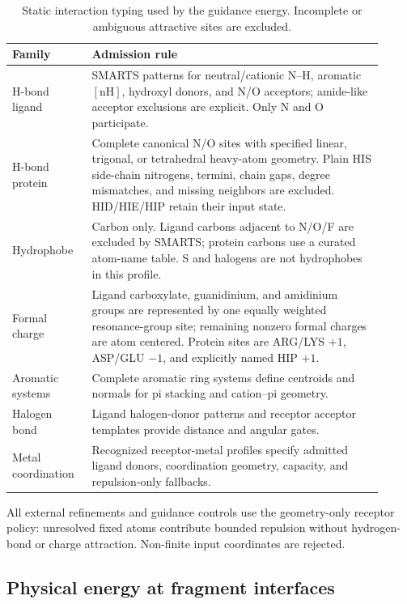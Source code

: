\documentclass{article}
\begin{document}
\begin{table}[!t]
    \centering
    \caption{Static interaction typing used by the guidance energy. Incomplete or ambiguous attractive sites are excluded.}
    \label{tab:si_typing}
    \begin{tabular}{p{0.19\linewidth}p{0.72\linewidth}}
        \toprule
        Family & Admission rule \\
        \midrule
        H-bond ligand & SMARTS patterns for neutral/cationic N--H, aromatic \(\mathrm{[nH]}\), hydroxyl donors, and N/O acceptors; amide-like acceptor exclusions are explicit.
        Only N and O participate. \\
        H-bond protein & Complete canonical N/O sites with specified linear, trigonal, or tetrahedral heavy-atom geometry.
        Plain HIS side-chain nitrogens, termini, chain gaps, degree mismatches, and missing neighbors are excluded.
        HID/HIE/HIP retain their input state. \\
        Hydrophobe & Carbon only.
        Ligand carbons adjacent to N/O/F are excluded by SMARTS; protein carbons use a curated atom-name table.
        S and halogens are not hydrophobes in this profile. \\
        Formal charge & Ligand carboxylate, guanidinium, and amidinium groups are represented by one equally weighted resonance-group site; remaining nonzero formal charges are atom centered.
        Protein sites are ARG/LYS \(+1\), ASP/GLU \(-1\), and explicitly named HIP \(+1\). \\
        Aromatic systems & Complete aromatic ring systems define centroids and normals for pi stacking and cation--pi geometry. \\
        Halogen bond & Ligand halogen-donor patterns and receptor acceptor templates provide distance and angular gates. \\
        Metal coordination & Recognized receptor-metal profiles specify admitted ligand donors, coordination geometry, capacity, and repulsion-only fallbacks. \\
        \bottomrule
    \end{tabular}
\end{table}

All external refinements and guidance controls use the geometry-only receptor policy: unresolved fixed atoms contribute bounded repulsion without hydrogen-bond or charge attraction. Non-finite input coordinates are rejected.

\subsection{Physical energy at fragment interfaces}
\label{si:guidance_physical}
\end{document}
